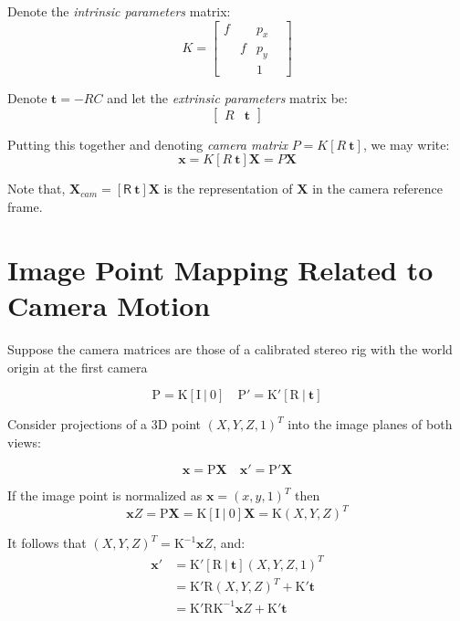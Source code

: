 \documentclass[runningheads]{llncs}
\begin{document}
Denote the \emph{intrinsic parameters} matrix:
\begin{equation}
\label{eq:intrinsic}
K=\begin{bmatrix} f & & p_x & \\ & f & p_y & \\ & & 1 & \end{bmatrix}
\end{equation}

Denote $\mathbf{t} = -RC$ and let the \emph{extrinsic parameters}
matrix be:
\begin{equation}
\begin{bmatrix}
R & \mathbf{t}
\end{bmatrix}
\end{equation}

Putting this together and denoting \emph{camera matrix}
$P=K[R\ \mathbf{t}]$, we may write:
\begin{equation}
\mathbf{x} = K[R\ \mathbf{t}]\mathbf{X} = P\mathbf{X}
\end{equation}

Note that, $ \mathbf{X}_{cam}= [\mathsf{R}\ \mathbf{t}]\mathbf{X}$ is the
representation of $\mathbf{X}$ in the camera reference frame.

\section{Image Point Mapping Related to Camera Motion}

Suppose the camera matrices are those of a calibrated stereo rig with
the world origin at the first camera

\[
\mathrm{P = K[I\ |\ 0]\quad P'=K'[R\ |\ \mathbf{t}]}
\]

Consider projections of a 3D point $(X,Y,Z,1)^T$ into the image planes of both views:

\[
\mathrm{\mathbf{x} = P\mathbf{X} \quad \mathbf{x}' = P'\mathbf{X}}
\]

If the image point is normalized as $\mathbf{x} = (x,y,1)^T$ then
\[
\mathbf{x}Z = \mathrm{P\mathbf{X} = K[I\ |\ 0]\mathbf{X} = K}(X,Y,Z)^T
\]

It follows that $(X,Y,Z)^T = \mathrm{K^{-1}}\mathbf{x}Z$, and:
\begin{align}
  \mathbf{x}' &= \mathrm{K'[R\ |\ \mathbf{t}]}(X,Y,Z,1)^T \\
  &= \mathrm{K'R}(X,Y,Z)^T + \mathrm{K'\mathbf{t}}\\
  &= \mathrm{K'RK^{-1}}\mathbf{x}Z + \mathrm{K'\mathbf{t}}\\
\end{align}
\end{document}
